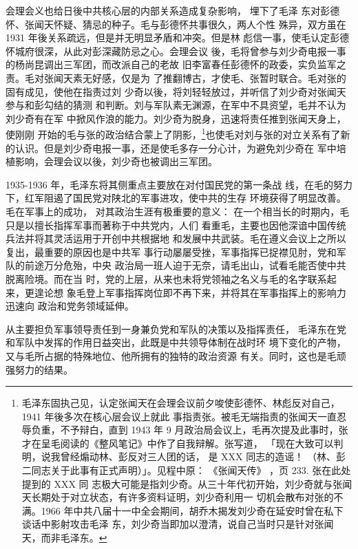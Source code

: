会理会义也给日後中共核心层的内部关系造成复杂影响，
埋下了毛泽
东对彭德怀、张闻天怀疑、猜忌的种子。毛与彭德怀共事很久，两人个性
殊异，双方虽在 1931 年後关系疏远，但是并无明显矛盾和冲突。但是林
彪信一事，使毛认定彭德怀城府很深，从此对彭深藏防忌之心。会理会议
後，毛将曾参与刘少奇电报一事的杨尚昆调出三军团，而改派自己的老故
旧李富春任彭德怀的政委，实负监军之责。毛对张闻天素无好感，仅是为
了推翻博古，才使毛、张暂时联合。毛对张的固有成见，使他在指责过刘
少奇以後，将刘轻轻放过，并听信了刘少奇对张闻天参与和彭勾结的猜测
和判断。刘与军队素无渊源，在军中不具资望，毛并不认为刘少奇有在军
中掀风作浪的能力。刘少奇为脱身，迅速将责任推到张闻天身上，使刚刚
开始的毛与张的政治结合蒙上了阴影，\footnote{毛泽东固执己见，认定张闻天在会理会议前夕唆使彭德怀、林彪反对自己，1941 年後多次在核心层会议上就此
事指责张。被毛无端指责的张闻天一直忍辱负重，不予辩白，直到 1943 年 9 月政治局会议上，毛再次提及此事时，张
才在呈毛阅读的《整风笔记》中作了自我辩解。张写道，
「现在大致可以判明，说我曾经煽动林、彭反对三人团的话，
是 XXX 同志的造谣！
（林、彭二同志关于此事有正式声明）」。见程中原：
《张闻天传》
，页 233. 张在此处提到的 XXX 同
志极大可能是指刘少奇。从三十年代初开始，刘少奇就与张闻天长期处于对立状态，有许多资料证明，刘少奇利用一
切机会散布对张的不满。1966 年中共八届十一中全会期间，胡乔木揭发刘少奇在延安时曾在私下谈话中影射攻击毛泽
东，刘少奇当即加以澄清，说自己当时只是针对张闻天，而非毛泽东。
}也使毛对刘与张的对立关系有了新
的认识。但是刘少奇电报一事，还是使毛多存一分心计，为避免刘少奇在
军中培植影响，会理会议以後，刘少奇也被调出三军团。

1935-1936 年，毛泽东将其侧重点主要放在对付国民党的第一条战
线，在毛的努力下，红军阻遏了国民党对陕北的军事进攻，使中共的生存
环境获得了明显改善。
毛在军事上的成功，
对其政治生涯有极重要的意义：
在一个相当长的时期内，毛只是以擅长指挥军事而著称于中共党内，人们
看重毛，主要也因他深谙中国传统兵法并将其灵活运用于开创中共根据地
和发展中共武装。毛在遵义会议上之所以复出，最重要的原因也是中共军
事行动屡屡受挫，军事指挥已捉襟见肘，党和军队的前途万分危殆，中央
政治局一班人迫于无奈，请毛出山，试看毛能否使中共脱离险境。而在当
时，党的上层，从来也未将党领袖之名义与毛的名字联系起来，更遑论想
象毛登上军事指挥岗位即不再下来，并将其在军事指挥上的影响力迅速向
政治和党务领域延伸。

从主要担负军事领导责任到一身兼负党和军队的决策以及指挥责任，
毛泽东在党和军队中发挥的作用日益突出，此既是中共领导体制在战时环
境下变化的产物，又与毛所占据的特殊地位、他所拥有的独特的政治资源
有关。同时，这也是毛顽强努力的结果。

